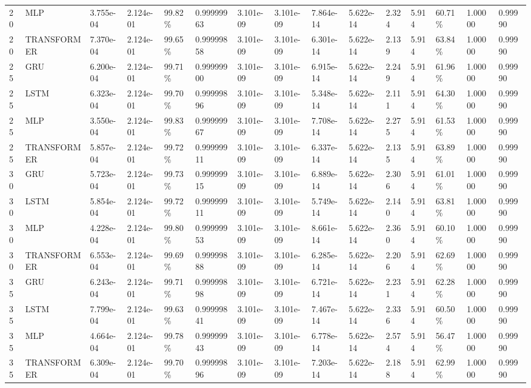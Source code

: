 \begin{table}[t]
{\begin{tabular}{lllllllllllllll}
20 & MLP & 3.755e-04 & 2.124e-01 & 99.82\% & 0.99999963 & 3.101e-09 & 3.101e-09 & 7.864e-14 & 5.622e-14 & 2.324 & 5.914 & 60.71\% & 1.00000 & 0.99990 \\
20 & TRANSFORMER & 7.370e-04 & 2.124e-01 & 99.65\% & 0.99999858 & 3.101e-09 & 3.101e-09 & 6.301e-14 & 5.622e-14 & 2.139 & 5.914 & 63.84\% & 1.00000 & 0.99990 \\
25 & GRU & 6.200e-04 & 2.124e-01 & 99.71\% & 0.99999900 & 3.101e-09 & 3.101e-09 & 6.915e-14 & 5.622e-14 & 2.249 & 5.914 & 61.96\% & 1.00000 & 0.99990 \\
25 & LSTM & 6.323e-04 & 2.124e-01 & 99.70\% & 0.99999896 & 3.101e-09 & 3.101e-09 & 5.348e-14 & 5.622e-14 & 2.111 & 5.914 & 64.30\% & 1.00000 & 0.99990 \\
25 & MLP & 3.550e-04 & 2.124e-01 & 99.83\% & 0.99999967 & 3.101e-09 & 3.101e-09 & 7.708e-14 & 5.622e-14 & 2.275 & 5.914 & 61.53\% & 1.00000 & 0.99990 \\
25 & TRANSFORMER & 5.857e-04 & 2.124e-01 & 99.72\% & 0.99999911 & 3.101e-09 & 3.101e-09 & 6.337e-14 & 5.622e-14 & 2.135 & 5.914 & 63.89\% & 1.00000 & 0.99990 \\
30 & GRU & 5.723e-04 & 2.124e-01 & 99.73\% & 0.99999915 & 3.101e-09 & 3.101e-09 & 6.889e-14 & 5.622e-14 & 2.306 & 5.914 & 61.01\% & 1.00000 & 0.99990 \\
30 & LSTM & 5.854e-04 & 2.124e-01 & 99.72\% & 0.99999911 & 3.101e-09 & 3.101e-09 & 5.749e-14 & 5.622e-14 & 2.140 & 5.914 & 63.81\% & 1.00000 & 0.99990 \\
30 & MLP & 4.228e-04 & 2.124e-01 & 99.80\% & 0.99999953 & 3.101e-09 & 3.101e-09 & 8.661e-14 & 5.622e-14 & 2.360 & 5.914 & 60.10\% & 1.00000 & 0.99990 \\
30 & TRANSFORMER & 6.553e-04 & 2.124e-01 & 99.69\% & 0.99999888 & 3.101e-09 & 3.101e-09 & 6.285e-14 & 5.622e-14 & 2.206 & 5.914 & 62.69\% & 1.00000 & 0.99990 \\
35 & GRU & 6.243e-04 & 2.124e-01 & 99.71\% & 0.99999898 & 3.101e-09 & 3.101e-09 & 6.721e-14 & 5.622e-14 & 2.231 & 5.914 & 62.28\% & 1.00000 & 0.99990 \\
35 & LSTM & 7.799e-04 & 2.124e-01 & 99.63\% & 0.99999841 & 3.101e-09 & 3.101e-09 & 7.467e-14 & 5.622e-14 & 2.336 & 5.914 & 60.50\% & 1.00000 & 0.99990 \\
35 & MLP & 4.664e-04 & 2.124e-01 & 99.78\% & 0.99999943 & 3.101e-09 & 3.101e-09 & 6.778e-14 & 5.622e-14 & 2.574 & 5.914 & 56.47\% & 1.00000 & 0.99990 \\
35 & TRANSFORMER & 6.309e-04 & 2.124e-01 & 99.70\% & 0.99999896 & 3.101e-09 & 3.101e-09 & 7.203e-14 & 5.622e-14 & 2.188 & 5.914 & 62.99\% & 1.00000 & 0.99990 \\
\hline
\end{tabular}%
}
\end{table}